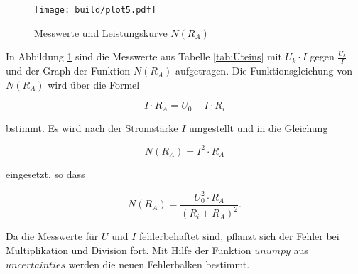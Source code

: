   \begin{figure}[h]
    \texttt{[image: build/plot5.pdf]}
    \caption{Messwerte und Leistungskurve $N(R_A)$}
    \label{fig:U5}
  \end{figure}

  In Abbildung \ref{fig:U5} sind die Messwerte aus Tabelle \ref{tab:Uteins}
  mit $U_k \cdot I$ gegen $\frac{U_k}{I}$ und der Graph der Funktion $N(R_A)$
  aufgetragen. Die Funktionsgleichung von $N(R_A)$ wird über die Formel

  \begin{equation}
    I \cdot R_A = U_0 - I \cdot R_i
  \end{equation}

  bstimmt. Es wird nach der Stromstärke $I$ umgestellt und in die Gleichung

  \begin{equation}
    N(R_A) = I^2 \cdot R_A
  \end{equation}

  eingesetzt, so dass

  \begin{equation}
    N(R_A) = \frac{U_0^2 \cdot R_A}{(R_i + R_A)^2}.
  \end{equation}

  Da die Messwerte für $U$ und $I$ fehlerbehaftet sind, pflanzt sich der
  Fehler bei Multiplikation und Division fort. Mit Hilfe der Funktion
  $unumpy$ aus $uncertainties$ \cite{uncertainties} werden die neuen Fehlerbalken bestimmt.

